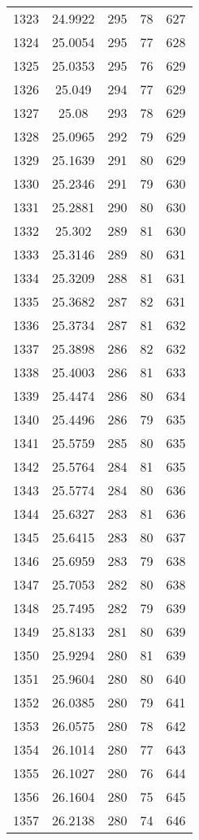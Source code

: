 \documentclass[12pt,a4paper]{article}
\begin{document}
\begin{tabular}{r|cccc}
	1323 & 24.9922 & 295 & 78 & 627 \\
	1324 & 25.0054 & 295 & 77 & 628 \\
	1325 & 25.0353 & 295 & 76 & 629 \\
	1326 & 25.049 & 294 & 77 & 629 \\
	1327 & 25.08 & 293 & 78 & 629 \\
	1328 & 25.0965 & 292 & 79 & 629 \\
	1329 & 25.1639 & 291 & 80 & 629 \\
	1330 & 25.2346 & 291 & 79 & 630 \\
	1331 & 25.2881 & 290 & 80 & 630 \\
	1332 & 25.302 & 289 & 81 & 630 \\
	1333 & 25.3146 & 289 & 80 & 631 \\
	1334 & 25.3209 & 288 & 81 & 631 \\
	1335 & 25.3682 & 287 & 82 & 631 \\
	1336 & 25.3734 & 287 & 81 & 632 \\
	1337 & 25.3898 & 286 & 82 & 632 \\
	1338 & 25.4003 & 286 & 81 & 633 \\
	1339 & 25.4474 & 286 & 80 & 634 \\
	1340 & 25.4496 & 286 & 79 & 635 \\
	1341 & 25.5759 & 285 & 80 & 635 \\
	1342 & 25.5764 & 284 & 81 & 635 \\
	1343 & 25.5774 & 284 & 80 & 636 \\
	1344 & 25.6327 & 283 & 81 & 636 \\
	1345 & 25.6415 & 283 & 80 & 637 \\
	1346 & 25.6959 & 283 & 79 & 638 \\
	1347 & 25.7053 & 282 & 80 & 638 \\
	1348 & 25.7495 & 282 & 79 & 639 \\
	1349 & 25.8133 & 281 & 80 & 639 \\
	1350 & 25.9294 & 280 & 81 & 639 \\
	1351 & 25.9604 & 280 & 80 & 640 \\
	1352 & 26.0385 & 280 & 79 & 641 \\
	1353 & 26.0575 & 280 & 78 & 642 \\
	1354 & 26.1014 & 280 & 77 & 643 \\
	1355 & 26.1027 & 280 & 76 & 644 \\
	1356 & 26.1604 & 280 & 75 & 645 \\
	1357 & 26.2138 & 280 & 74 & 646 \\

\end{tabular}
\end{document}
